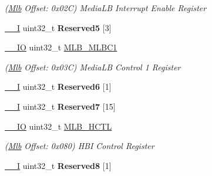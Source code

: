 \begin{DoxyCompactItemize}
\begin{DoxyCompactList}\small\item\em (\mbox{\hyperlink{structMlb}{Mlb}} Offset\+: 0x02C) Media\+LB Interrupt Enable Register \end{DoxyCompactList}\item 
\mbox{\label{structMlb_a18f67d85440b1f693e37313107823621}} 
\mbox{\hyperlink{core__cm7_8h_af63697ed9952cc71e1225efe205f6cd3}{\+\_\+\+\_\+I}} uint32\+\_\+t {\bfseries Reserved5} \mbox{[}3\mbox{]}
\item 
\mbox{\label{structMlb_af89332e00a243afd4818aa1f45de6c3a}} 
\mbox{\hyperlink{core__cm7_8h_aec43007d9998a0a0e01faede4133d6be}{\+\_\+\+\_\+\+IO}} uint32\+\_\+t \mbox{\hyperlink{structMlb_af89332e00a243afd4818aa1f45de6c3a}{M\+L\+B\+\_\+\+M\+L\+B\+C1}}
\begin{DoxyCompactList}\small\item\em (\mbox{\hyperlink{structMlb}{Mlb}} Offset\+: 0x03C) Media\+LB Control 1 Register \end{DoxyCompactList}\item 
\mbox{\label{structMlb_a2084694519803001b4a8a127de6fdbe4}} 
\mbox{\hyperlink{core__cm7_8h_af63697ed9952cc71e1225efe205f6cd3}{\+\_\+\+\_\+I}} uint32\+\_\+t {\bfseries Reserved6} \mbox{[}1\mbox{]}
\item 
\mbox{\label{structMlb_a265dd3abcc5e0be0f354958c657d283e}} 
\mbox{\hyperlink{core__cm7_8h_af63697ed9952cc71e1225efe205f6cd3}{\+\_\+\+\_\+I}} uint32\+\_\+t {\bfseries Reserved7} \mbox{[}15\mbox{]}
\item 
\mbox{\label{structMlb_ad32e43411efa19a15b617f5e32625c0e}} 
\mbox{\hyperlink{core__cm7_8h_aec43007d9998a0a0e01faede4133d6be}{\+\_\+\+\_\+\+IO}} uint32\+\_\+t \mbox{\hyperlink{structMlb_ad32e43411efa19a15b617f5e32625c0e}{M\+L\+B\+\_\+\+H\+C\+TL}}
\begin{DoxyCompactList}\small\item\em (\mbox{\hyperlink{structMlb}{Mlb}} Offset\+: 0x080) H\+BI Control Register \end{DoxyCompactList}\item 
\mbox{\label{structMlb_ab515014e9c10430b202b104d435979cd}} 
\mbox{\hyperlink{core__cm7_8h_af63697ed9952cc71e1225efe205f6cd3}{\+\_\+\+\_\+I}} uint32\+\_\+t {\bfseries Reserved8} \mbox{[}1\mbox{]}

\end{DoxyCompactItemize}
